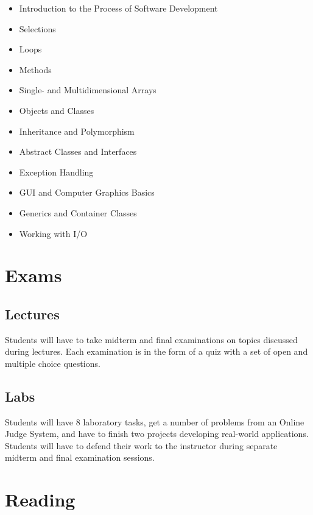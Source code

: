 \documentclass[12pt,a4paper,oneside]{article}
\begin{document}
        \begin{itemize}
            \item Introduction to the Process of Software Development
            \item Selections
            \item Loops
            \item Methods
            \item Single- and Multidimensional Arrays
            \item Objects and Classes
            \item Inheritance and Polymorphism
            \item Abstract Classes and Interfaces
            \item Exception Handling
            \item GUI and Computer Graphics Basics
            \item Generics and Container Classes
            \item Working with I/O
        \end{itemize}

    \section{Exams}

        \subsection{Lectures}

            Students will have to take midterm and final examinations on topics
            discussed during lectures. Each examination is in the form of a quiz
            with a set of open and multiple choice questions.

        \subsection{Labs}

            Students will have 8 laboratory tasks, get a number of problems from
            an Online Judge System, and have to finish two projects developing
            real-world applications. Students will have to defend their work to
            the instructor during separate midterm and final examination
            sessions.

    \section{Reading}
\end{document}

